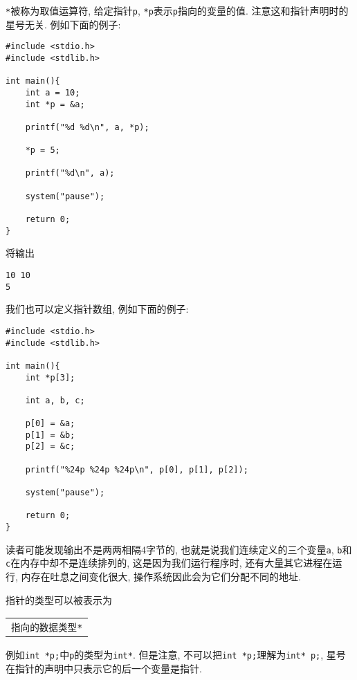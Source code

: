         \texttt{*}被称为取值运算符, 给定指针\texttt{p}, \texttt{*p}表示\texttt{p}指向的变量的值. 注意这和指针声明时的星号无关. 例如下面的例子:
\begin{lstlisting}
#include <stdio.h>
#include <stdlib.h>

int main(){
    int a = 10;
    int *p = &a;

    printf("%d %d\n", a, *p);

    *p = 5;

    printf("%d\n", a);

    system("pause");

    return 0;
}
\end{lstlisting}
        将输出
\begin{lstlisting}
10 10
5
\end{lstlisting}

        我们也可以定义指针数组, 例如下面的例子:
\begin{lstlisting}
#include <stdio.h>
#include <stdlib.h>

int main(){
    int *p[3];

    int a, b, c;

    p[0] = &a;
    p[1] = &b;
    p[2] = &c;

    printf("%24p %24p %24p\n", p[0], p[1], p[2]);

    system("pause");

    return 0;
}
\end{lstlisting}

        读者可能发现输出不是两两相隔4字节的, 也就是说我们连续定义的三个变量\texttt{a}, \texttt{b}和\texttt{c}在内存中却不是连续排列的, 这是因为我们运行程序时, 还有大量其它进程在运行, 内存在吐息之间变化很大, 操作系统因此会为它们分配不同的地址.

        指针的类型可以被表示为
        \begin{center}
        \begin{longtable}{l}
            \texttt{指向的数据类型\hspace*{-0.25pt}*}
        \end{longtable}
        \end{center}

        例如\texttt{int *p;}中\texttt{p}的类型为\texttt{int*}. 但是注意, 不可以把\texttt{int *p;}理解为\texttt{int* p;}, 星号在指针的声明中只表示它的后一个变量是指针.

